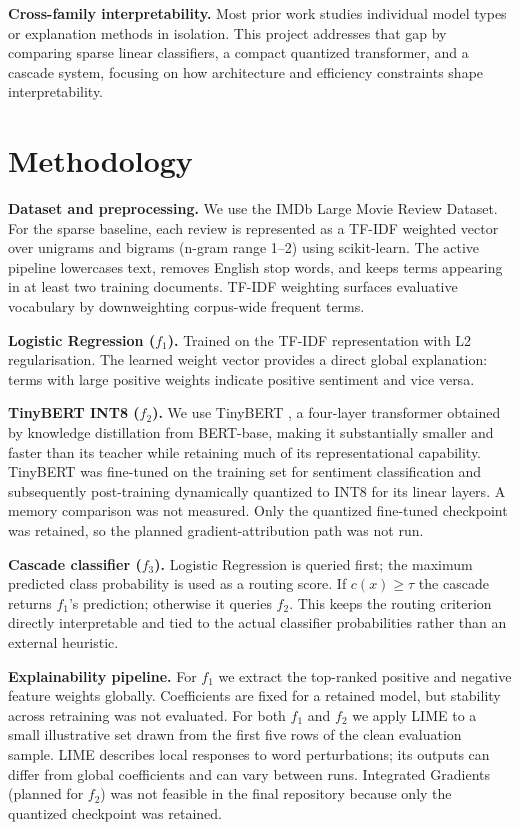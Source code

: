 \documentclass[10pt]{article}
\begin{document}
\textbf{Cross-family interpretability.}  Most prior work studies individual
model types or explanation methods in isolation.  This project addresses that
gap by comparing sparse linear classifiers, a compact quantized transformer,
and a cascade system, focusing on how architecture and efficiency constraints
shape interpretability.


\section{Methodology}

\textbf{Dataset and preprocessing.}  We use the IMDb Large Movie Review Dataset.
For the sparse baseline, each review is represented as a TF-IDF weighted vector
over unigrams and bigrams (n-gram range 1--2) using scikit-learn.  The active
pipeline lowercases text, removes English stop words, and keeps terms appearing
in at least two training documents.  TF-IDF weighting surfaces evaluative
vocabulary by downweighting corpus-wide frequent terms.

\textbf{Logistic Regression ($f_1$).}  Trained on the TF-IDF representation
with L2 regularisation.  The learned weight vector provides a direct global
explanation: terms with large positive weights indicate positive sentiment and
vice versa.

\textbf{TinyBERT INT8 ($f_2$).}  We use TinyBERT \citep{jiao2020}, a
four-layer transformer obtained by knowledge distillation from BERT-base,
making it substantially smaller and faster than its teacher while retaining
much of its representational capability.  TinyBERT was fine-tuned on the
training set for sentiment classification and subsequently post-training
dynamically quantized to INT8 for its linear layers. A memory comparison
was not measured. Only the quantized fine-tuned checkpoint was retained, so
the planned gradient-attribution path was not run.

\textbf{Cascade classifier ($f_3$).}  Logistic Regression is queried first; the
maximum predicted class probability is used as a routing score.  If
$c(x) \geq \tau$ the cascade returns $f_1$'s prediction; otherwise it queries
$f_2$.  This keeps the routing criterion directly interpretable and tied to the
actual classifier probabilities rather than an external heuristic.

\textbf{Explainability pipeline.}  For $f_1$ we extract the top-ranked positive
and negative feature weights globally. Coefficients are fixed for a retained
model, but stability across retraining was not evaluated.  For both $f_1$ and $f_2$ we apply LIME to a
small illustrative set drawn from the first five rows of the clean evaluation
sample. LIME describes local responses to word perturbations; its outputs
can differ from global coefficients and can vary between runs.  Integrated Gradients (planned for
$f_2$) was not feasible in the final repository because only the quantized
checkpoint was retained.
\end{document}

